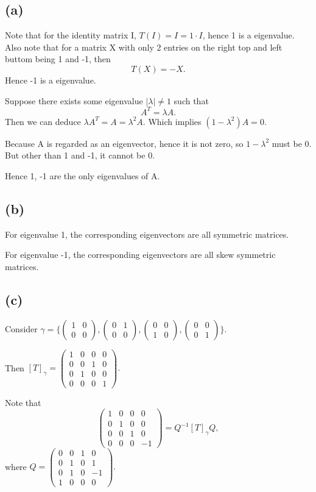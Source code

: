 \documentclass[12pt]{article}%
\begin{document}
\subsection{(a)}
Note that for the identity matrix I, $T(I)=I=1\cdot I$, hence 1 is a eigenvalue. 
Also note that for a matrix X with only 2 entries on the right top and left buttom being 1 and -1, then $$T(X)=-X.$$ Hence -1 is a eigenvalue.

Suppose there exists some eigenvalue $|\lambda| \neq 1$ such that $$A^{T}=\lambda A.$$ Then we can deduce $\lambda A^{T}=A=\lambda^{2}A.$ Which implies $(1-\lambda^2)A=0.$ 

Because A is regarded as an eigenvector, hence it is not zero, so $1-\lambda^2$ must be 0. But other than 1 and -1, it cannot be 0.

Hence 1, -1 are the only eigenvalues of A.

\subsection{(b)}

For eigenvalue 1, the corresponding eigenvectors are all symmetric matrices. 

For eigenvalue -1, the corresponding eigenvectors are all skew symmetric matrices.

\subsection{(c)}
Consider $\gamma=\{\begin{pmatrix} 1&0\\0&0\end{pmatrix}, \begin{pmatrix} 0&1\\0&0\end{pmatrix}, \begin{pmatrix} 0&0\\1&0\end{pmatrix}, \begin{pmatrix} 0&0\\0&1\end{pmatrix}\}.$

Then $[T]_\gamma = \begin{pmatrix} 1&0&0&0\\0&0&1&0\\0&1&0&0\\0&0&0&1\end{pmatrix}.$

Note that $$\begin{pmatrix} 1&0&0&0\\0&1&0&0\\0&0&1&0\\0&0&0&-1\end{pmatrix}=Q^{-1}[T]_\gamma Q,$$ where $Q=\begin{pmatrix} 0&0&1&0\\0&1&0&1\\0&1&0&-1\\1&0&0&0\end{pmatrix}.$
\end{document}
